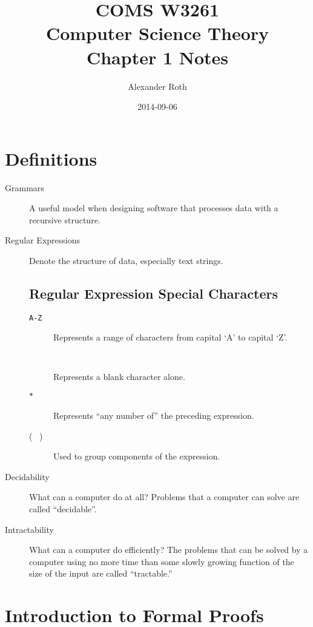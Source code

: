 \documentclass[]{article}
\begin{document}
\title{COMS W3261 \\ Computer Science Theory \\ Chapter 1 Notes}
\author{Alexander Roth}
\date{2014-09-06}
\maketitle

\section*{Definitions}
  \begin{description}
    \item[Grammars] A useful model when designing software that processes data 
    with a recursive structure.
    \item[Regular Expressions] Denote the structure of data, especially text
    strings.
  
  \subsection*{Regular Expression Special Characters}
    \begin{description}
      \item[\texttt{\lbrack A-Z\rbrack}] Represents a range of characters from
      capital `A' to capital `Z'.
      \item[\texttt{\lbrack \, \rbrack}] Represents a blank character alone.
      \item[\texttt{*}] Represents ``any number of'' the preceding expression.
      \item[( \, )] Used to group components of the expression. 
    \end{description}
    
  \item[Decidability] What can a computer do at all? Problems that a computer
  can solve are called ``decidable''.
  \item[Intractability] What can a computer do efficiently? The problems that 
  can be solved by a computer using no more time than some slowly growing 
  function of the size of the input are called ``tractable.''
  
  \end{description}
 
\section*{Introduction to Formal Proofs}
\end{document}
